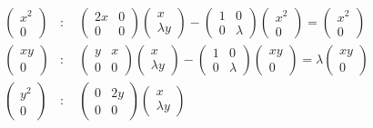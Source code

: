 \documentclass{article}
\begin{document}
\begin{align*}
\begin{pmatrix} x^2 \\ 0 \end{pmatrix}&: \quad
\begin{pmatrix} 2x & 0 \\ 0 & 0 \end{pmatrix}
\begin{pmatrix} x \\ \lambda y \end{pmatrix}
-
\begin{pmatrix} 1 & 0 \\ 0 & \lambda \end{pmatrix}
\begin{pmatrix} x^2 \\ 0 \end{pmatrix}
=
\begin{pmatrix} x^2 \\ 0 \end{pmatrix}\\
\begin{pmatrix} xy \\ 0 \end{pmatrix}&: \quad
\begin{pmatrix} y & x \\ 0 & 0 \end{pmatrix}
\begin{pmatrix} x \\ \lambda y \end{pmatrix}
-
\begin{pmatrix} 1 & 0 \\ 0 & \lambda \end{pmatrix}
\begin{pmatrix} xy \\ 0 \end{pmatrix}
= \lambda \begin{pmatrix} xy \\ 0 \end{pmatrix}\\
\begin{pmatrix} y^2 \\ 0 \end{pmatrix}&: \quad
\begin{pmatrix} 0 & 2y \\ 0 & 0 \end{pmatrix}
\begin{pmatrix} x \\ \lambda y \end{pmatrix}

\end{align*}
\end{document}
